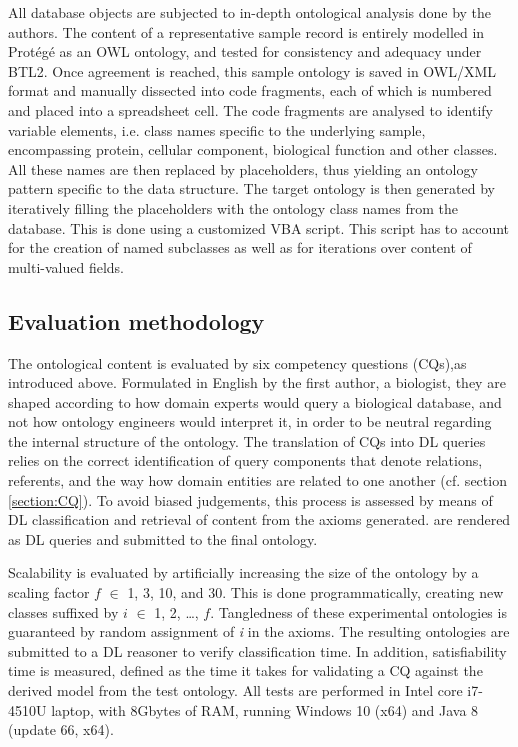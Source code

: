 All database objects are subjected to in-depth ontological analysis done by the authors. The content of a representative 
sample record is entirely modelled in Prot\'{e}g\'{e} as an OWL ontology, and tested for consistency and adequacy under BTL2. Once agreement is reached, this sample ontology is saved in OWL/XML format and manually dissected into code fragments, each of which is numbered and placed into a spreadsheet cell.  The code fragments are analysed to identify variable elements, i.e. class names specific to the underlying sample, encompassing protein, cellular component, biological function and other classes. All these names are then replaced by placeholders, thus yielding an ontology pattern specific to the data structure. 
The target ontology is then generated by iteratively filling the placeholders with the ontology class names from the database. This is done using a customized VBA script. This script has to account for the creation of named subclasses as well as for iterations over content of multi-valued fields.  

%

\subsection{Evaluation methodology} \label{EvaluationMethodology}
The ontological content is evaluated by six competency questions (CQs),as introduced above. Formulated in English by the first author, a biologist, they are shaped according to how domain experts would query a biological database, and not how ontology engineers would interpret it, in order to be neutral regarding the internal structure of the ontology.
The translation of CQs into DL queries relies on the correct identification of query components that denote relations, referents, and the way how domain entities are related to one another (cf. section \ref{section:CQ}). To avoid biased judgements, this process is assessed by means of DL 
classification and retrieval of content from the axioms generated. %
are rendered as DL queries and submitted to the final ontology.

 
Scalability is evaluated by artificially increasing the size of the ontology by a scaling factor $f$ $\in$ {1, 3, 10, and 30}. This is done programmatically, creating new classes suffixed by $i$ $\in$ {1, 2, \ldots, $f$}. Tangledness of these experimental ontologies is guaranteed by random assignment of \textit{i} in the axioms.  
The resulting ontologies are submitted to a DL reasoner to verify classification time. In addition, 
satisfiability time is measured, defined as the time it takes for validating a CQ 
against the derived model from the test ontology.
All tests are performed in Intel core i7-4510U laptop, with 8Gbytes of RAM, running Windows 10 (x64) and Java 8 (update 66, x64).
